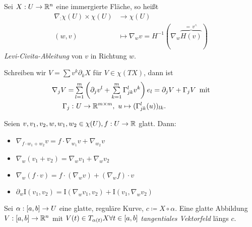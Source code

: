\documentclass{cheat-sheet}
\newcommand{\I}{\mathrm{I}}
\begin{document}
\begin{defn}
  Sei $X : U \to \mathbb{R}^n$ eine immergierte Fläche, so heißt
  \begin{align*}
    \nabla_ : \chi(U) \times \chi(U) &\to \chi(U) \\[-12pt]
    (w, v) &\mapsto \nabla_w v = H^{-1}(\nabla_w \overbrace{H(v)}^{=\,v^\wedge})
  \end{align*}
  \emph{Levi-Civita-Ableitung} von $v$ in Richtung $w$.
\end{defn}

\begin{bem}
  Schreiben wir $V = \sum v^k \partial_k X$ für $V \in \chi(TX)$, dann ist
  \begin{align*}
    \nabla_j V =& \sum_{l=1}^m \left( \partial_j v^l + \sum_{k=1}^m \Gamma_{jk}^l v^k \right) e_l = \partial_j V + \Gamma_j V \enspace \text{mit}\\
    \Gamma_j :& \,\, U \to \R^{m \times m}, \,\, u \mapsto (\Gamma_{jk}^l(u))_{lk}.
  \end{align*}
\end{bem}

\begin{satz}
  Seien $v, v_1, v_2, w, w_1, w_2 \in \chi(U), f : U \to \mathbb{R}$ glatt. Dann:
  \begin{itemize}
    \item $\nabla_{f \cdot w_1 + w_2} v = f \cdot \nabla_{w_1} v + \nabla_{w_2} v$ 
    \item $\nabla_w (v_1 + v_2) = \nabla_w v_1 + \nabla_w v_2$ 
    \item $\nabla_w (f \cdot v) = f \cdot (\nabla_w v) + (\nabla_w f) \cdot v$ 
    \item $\partial_w \I(v_1, v_2) = \I(\nabla_w v_1, v_2) + \I(v_1, \nabla_w v_2)$ 
  \end{itemize}
\end{satz}



\begin{defn}
  Sei $\alpha : \left[ a, b \right] \to U$ eine glatte, reguläre Kurve, $c \coloneqq X \circ \alpha$. Eine glatte Abbildung $V : \left[ a, b \right] \to \mathbb{R}^n$ mit $V(t) \in T_{\alpha(t)} X \forall t \in \left[ a, b \right]$ \emph{tangentiales Vektorfeld} längs $c$.
\end{defn}
\end{document}
